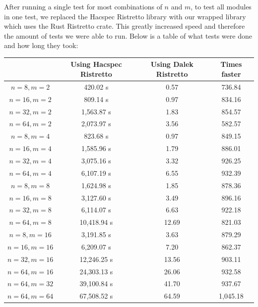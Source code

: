\documentclass{article}
\begin{document}
After running a single test for most combinations of $n$ and $m$, to
test all modules in one test, we replaced the Hacspec Ristretto library
with our wrapped library which uses the Rust Ristretto crate. This
greatly increased speed and therefore the amount of tests we were able
to run. Below is a table of what tests were done and how long they took:

\begin{center}
\begin{tabular}{ c|c|c|c } 
	& Using Hacspec Ristretto & Using Dalek Ristretto & Times faster\\ \hline\hline
	$n = 8, m = 2$    & 420.02 s     & 0.57  & 736.84 \\ \hline 
	$n = 16, m = 2$   & 809.14 s     & 0.97  & 834.16 \\ \hline 
	$n = 32, m = 2$   & 1,563.87 s   & 1.83  & 854.57 \\ \hline 
	$n = 64, m = 2$   & 2,073.97 s   & 3.56  & 582.57 \\ \hline 
	\hline\hline
	$n = 8, m = 4$    & 823.68 s     & 0.97  & 849.15 \\ \hline 
	$n = 16, m = 4$   & 1,585.96 s   & 1.79  & 886.01 \\ \hline 
	$n = 32, m = 4$   & 3,075.16 s   & 3.32  & 926.25 \\ \hline 
	$n = 64, m = 4$   & 6,107.19 s   & 6.55  & 932.39 \\ \hline 
	\hline\hline
	$n = 8, m = 8$    & 1,624.98 s   & 1.85  & 878.36 \\ \hline 
	$n = 16, m = 8$   & 3,127.60 s   & 3.49  & 896.16 \\ \hline 
	$n = 32, m = 8$   & 6,114.07 s   & 6.63  & 922.18 \\ \hline 
	$n = 64, m = 8$   & 10,418.94 s  & 12.69 & 821.03 \\ \hline 
	\hline\hline
	$n = 8, m = 16$   & 3,191.85 s   & 3.63  & 879.29 \\ \hline 
	$n = 16, m = 16$  & 6,209.07 s   & 7.20  & 862.37 \\ \hline 
	$n = 32, m = 16$  & 12,246.25 s  & 13.56 & 903.11 \\ \hline 
	$n = 64, m = 16$  & 24,303.13 s  & 26.06 & 932.58 \\ \hline 
	\hline\hline
	$n = 64, m = 32$  & 39,100.84 s  & 41.70 & 937.67 \\ \hline 
	\hline\hline
	$n = 64, m = 64$  & 67,508.52 s  & 64.59 & 1,045.18 \\ \hline 
\end{tabular}
\end{center}
\end{document}
